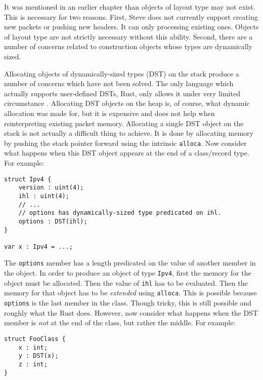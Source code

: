 It was mentioned in an earlier chapter than objects of layout type may not exist.
This is necessary for two reasons.
First, Steve does not currently support creating new packets or pushing new headers. 
It can only processing existing ones. 
Objects of layout type are not strictly necessary without this ability.
Second, there are a number of concerns related to construction objects whose
types are dynamically sized.

Allocating objects of dynamically-sized types (DST) on the stack produce a number of concerns which have not been solved.
The only language which actually supports user-defined DSTs, Rust, only allows it under 
very limited circumstance \cite{rust_dst_std}.
Allocating DST objects on the heap is, of course, what dynamic allocation was made for, but
it is expensive and does not help when reinterpreting existing packet memory.
Allocating a single DST object on the stack is not actually a difficult thing to achieve. 
It is done by allocating memory by pushing the stack pointer forward using the intrinsic
\texttt{alloca}. 
Now consider what happens when this DST object appears at the end of a class/record
type. For example:

\begin{codepage}
\begin{lstlisting}
struct Ipv4 {
	version : uint(4);
	ihl : uint(4);
	// ...
	// options has dynamically-sized type predicated on ihl.
	options : DST(ihl); 
}

var x : Ipv4 = ...;
\end{lstlisting}
\end{codepage}

The \texttt{options} member has a length predicated on the value
of another member in the object. In order to produce an object of type \texttt{Ipv4},
first the memory for the object must be allocated. Then the value of \texttt{ihl}
has to be evaluated. Then the memory for that object has to be \emph{extended}
using \texttt{alloca}. This is possible because \texttt{options} is the last member in the class. Though tricky, this is still possible and roughly what the Rust does.
However, now consider what happens when the DST member is \emph{not} at the end
of the class, but rather the middle. For example:

\begin{codepage}
\begin{lstlisting}
struct FooClass {
	x : int;
	y : DST(x);
	z : int;
}
\end{lstlisting}
\end{codepage}

